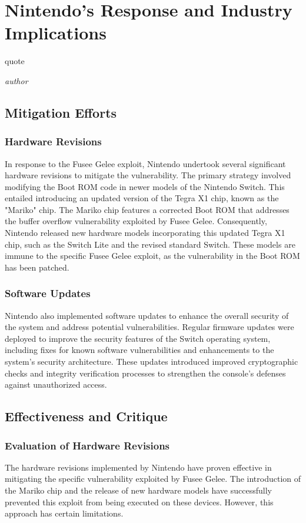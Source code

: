 \chapter{Nintendo's Response and Industry Implications}
\epigraph{quote}{\textit{author}}

\section{Mitigation Efforts}

\subsection{Hardware Revisions}
In response to the Fusee Gelee exploit, Nintendo undertook several significant hardware revisions to mitigate the vulnerability. The primary strategy involved modifying the Boot ROM code in newer models of the Nintendo Switch. This entailed introducing an updated version of the Tegra X1 chip, known as the "Mariko" chip. The Mariko chip features a corrected Boot ROM that addresses the buffer overflow vulnerability exploited by Fusee Gelee. Consequently, Nintendo released new hardware models incorporating this updated Tegra X1 chip, such as the Switch Lite and the revised standard Switch. These models are immune to the specific Fusee Gelee exploit, as the vulnerability in the Boot ROM has been patched.
\subsection{Software Updates}
Nintendo also implemented software updates to enhance the overall security of the system and address potential vulnerabilities. Regular firmware updates were deployed to improve the security features of the Switch operating system, including fixes for known software vulnerabilities and enhancements to the system's security architecture. These updates introduced improved cryptographic checks and integrity verification processes to strengthen the console's defenses against unauthorized access.


\section{Effectiveness and Critique}

\subsection{Evaluation of Hardware Revisions}
The hardware revisions implemented by Nintendo have proven effective in mitigating the specific vulnerability exploited by Fusee Gelee. The introduction of the Mariko chip and the release of new hardware models have successfully prevented this exploit from being executed on these devices. However, this approach has certain limitations.

